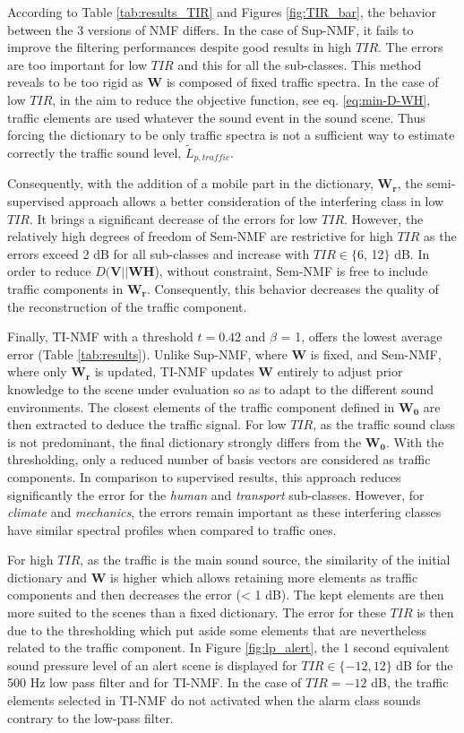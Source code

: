 \documentclass[twocolumn]{svjour3}          %
\begin{document}
According to Table \ref{tab:results_TIR} and Figures \ref{fig:TIR_bar}, the behavior between the 3 versions of NMF differs. In the case of Sup-NMF, it fails to improve the filtering performances despite good results in high $TIR$. The errors are too important for low $TIR$ and this for all the sub-classes. This method reveals to be too rigid as $\mathbf{W}$ is composed of fixed traffic spectra. In the case of low $TIR$, in the aim to reduce the objective function, see eq. \ref{eq:min-D-WH}, traffic elements are used whatever the sound event in the  sound scene. Thus forcing the dictionary to be only traffic spectra is not a sufficient way to estimate correctly the traffic sound level, $\tilde{L}_{p,traffic}$.

Consequently, with the addition of a mobile part in the dictionary, $\mathbf{W_r}$, the semi-supervised approach  allows a better consideration of the interfering class in low $TIR$. It brings a significant decrease of the errors for low $TIR$. However, the relatively high degrees of freedom of Sem-NMF are restrictive for high $TIR$ as the errors exceed 2 dB for all sub-classes and increase with $TIR \in \lbrace$6, 12$\rbrace$ dB. In order to reduce $D(\mathbf{V} \vert \vert \mathbf{WH}$), without constraint, Sem-NMF is free to include traffic components in $\mathbf{W_r}$. Consequently, this behavior decreases the quality of the reconstruction of the traffic component.

Finally, TI-NMF with a threshold $t = 0.42$ and $\beta$ = 1, offers the lowest average error (Table \ref{tab:results}). Unlike Sup-NMF, where $\mathbf{W}$ is fixed, and Sem-NMF, where only $\mathbf{W_r}$ is updated, TI-NMF updates $\mathbf{W}$ entirely to adjust prior knowledge to the scene under evaluation so as to adapt to the different sound environments. The closest elements of the traffic component defined in $\mathbf{W_0}$ are then extracted to deduce the traffic signal.
For low $TIR$, as the traffic sound class is not predominant, the final dictionary strongly differs from the $\mathbf{W_0}$. With the thresholding, only a reduced number of basis vectors are considered as traffic components. In comparison to supervised results, this approach reduces significantly the error for the \textit{human} and \textit{transport} sub-classes.  However, for \textit{climate} and \textit{mechanics}, the errors remain important as these interfering classes have similar spectral profiles when compared to traffic ones.

For high $TIR$, as the traffic is the main sound source, the similarity of the initial dictionary and $\mathbf{W}$ is higher which allows retaining more elements as traffic components and then decreases the error (< 1 dB). The kept elements are then more suited to the scenes than a fixed dictionary. The error for these $TIR$ is then due to the thresholding which put aside some elements that are nevertheless related to the traffic component. In Figure \ref{fig:lp_alert}, the 1 second equivalent sound pressure level of an alert scene is displayed for $TIR \in \lbrace -12,12 \rbrace$ dB for the 500 Hz low pass filter and for TI-NMF. In the case of $TIR=-12$ dB, the traffic elements selected in TI-NMF do not activated when the alarm class sounds contrary to the low-pass filter.
\end{document}
